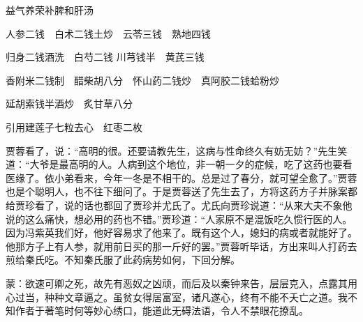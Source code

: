 \begin{qute}
    \begin{parag}
        益气养荣补脾和肝汤
    \end{parag}

    \begin{parag}
        人参二钱　白术二钱土炒　云苓三钱　熟地四钱
    \end{parag}

    \begin{parag}
        归身二钱酒洗　白芍二钱 川芎钱半　黄芪三钱
    \end{parag}

    \begin{parag}
        香附米二钱制　醋柴胡八分　怀山药二钱炒　真阿胶二钱蛤粉炒
    \end{parag}

    \begin{parag}
        延胡索钱半酒炒　炙甘草八分
    \end{parag}

    \begin{parag}
        引用建莲子七粒去心　红枣二枚
    \end{parag}
\end{qute}

\begin{parag}

    贾蓉看了，说：“高明的很。还要请教先生，这病与性命终久有妨无妨？”先生笑道：“大爷是最高明的人。人病到这个地位，非一朝一夕的症候，吃了这药也要看医缘了。依小弟看来，今年一冬是不相干的。总是过了春分，就可望全愈了。”贾蓉也是个聪明人，也不往下细问了。于是贾蓉送了先生去了，方将这药方子并脉案都给贾珍看了，说的话也都回了贾珍并尤氏了。尤氏向贾珍说道：“从来大夫不象他说的这么痛快，想必用的药也不错。”贾珍道：“人家原不是混饭吃久惯行医的人。因为冯紫英我们好，他好容易求了他来了。既有这个人，媳妇的病或者就能好了。他那方子上有人参，就用前日买的那一斤好的罢。”贾蓉听毕话，方出来叫人打药去煎给秦氏吃。不知秦氏服了此药病势如何，下回分解。
\end{parag}


\begin{parag}


    \begin{note}蒙：欲速可卿之死，故先有恶奴之凶顽，而后及以秦钟来告，层层克入，点露其用心过当，种种文章逼之。虽贫女得居富室，诸凡遂心，终有不能不夭亡之道。我不知作者于著笔时何等妙心绣口，能道此无碍法语，令人不禁眼花撩乱。\end{note}
\end{parag}
